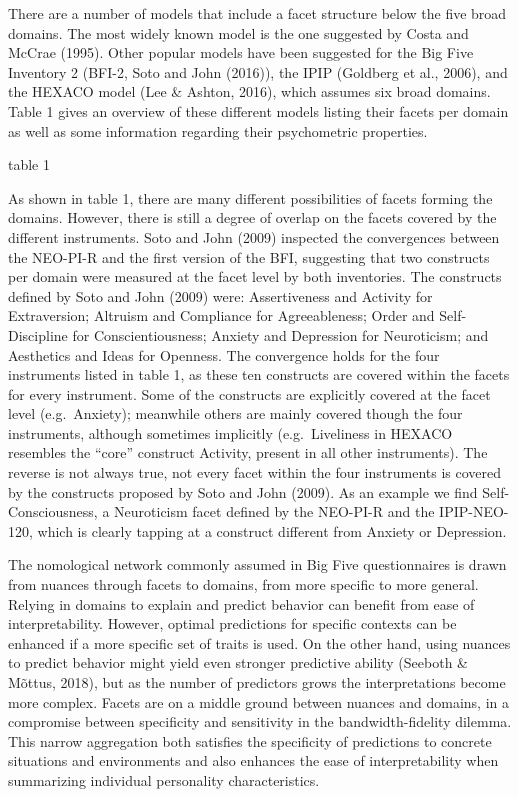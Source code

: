 \documentclass[man]{apa6}
\theoremstyle{definition}
\theoremstyle{definition}
\theoremstyle{definition}
\theoremstyle{remark}
\begin{document}
There are a number of models that include a facet structure below the
five broad domains. The most widely known model is the one suggested by
Costa and McCrae (1995). Other popular models have been suggested for
the Big Five Inventory 2 (BFI-2, Soto and John (2016)), the IPIP
(Goldberg et al., 2006), and the HEXACO model (Lee \& Ashton, 2016),
which assumes six broad domains. Table 1 gives an overview of these
different models listing their facets per domain as well as some
information regarding their psychometric properties.

table 1

As shown in table 1, there are many different possibilities of facets
forming the domains. However, there is still a degree of overlap on the
facets covered by the different instruments. Soto and John (2009)
inspected the convergences between the NEO-PI-R and the first version of
the BFI, suggesting that two constructs per domain were measured at the
facet level by both inventories. The constructs defined by Soto and John
(2009) were: Assertiveness and Activity for Extraversion; Altruism and
Compliance for Agreeableness; Order and Self-Discipline for
Conscientiousness; Anxiety and Depression for Neuroticism; and
Aesthetics and Ideas for Openness. The convergence holds for the four
instruments listed in table 1, as these ten constructs are covered
within the facets for every instrument. Some of the constructs are
explicitly covered at the facet level (e.g.~Anxiety); meanwhile others
are mainly covered though the four instruments, although sometimes
implicitly (e.g.~Liveliness in HEXACO resembles the \enquote{core}
construct Activity, present in all other instruments). The reverse is
not always true, not every facet within the four instruments is covered
by the constructs proposed by Soto and John (2009). As an example we
find Self-Consciousness, a Neuroticism facet defined by the NEO-PI-R and
the IPIP-NEO-120, which is clearly tapping at a construct different from
Anxiety or Depression.

The nomological network commonly assumed in Big Five questionnaires is
drawn from nuances through facets to domains, from more specific to more
general. Relying in domains to explain and predict behavior can benefit
from ease of interpretability. However, optimal predictions for specific
contexts can be enhanced if a more specific set of traits is used. On
the other hand, using nuances to predict behavior might yield even
stronger predictive ability (Seeboth \& Mõttus, 2018), but as the number
of predictors grows the interpretations become more complex. Facets are
on a middle ground between nuances and domains, in a compromise between
specificity and sensitivity in the bandwidth-fidelity dilemma. This
narrow aggregation both satisfies the specificity of predictions to
concrete situations and environments and also enhances the ease of
interpretability when summarizing individual personality
characteristics.
\end{document}
